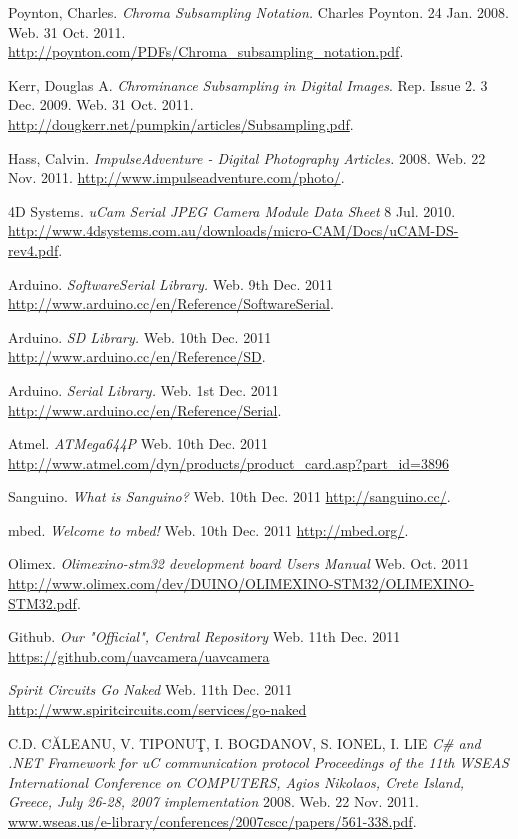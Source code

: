 \begin{thebibliography}{9}
	 Poynton, Charles. \emph{Chroma Subsampling Notation.} Charles Poynton. 24 Jan. 2008. Web. 31 Oct. 2011. \url{http://poynton.com/PDFs/Chroma_subsampling_notation.pdf}.
	
	 Kerr, Douglas A. \emph{Chrominance Subsampling in Digital Images}. Rep. Issue 2. 3 Dec. 2009. Web. 31 Oct. 2011. \url{http://dougkerr.net/pumpkin/articles/Subsampling.pdf}.
	
	 Hass, Calvin. \emph{ImpulseAdventure - Digital Photography Articles.} 2008. Web. 22 Nov. 2011. \url{http://www.impulseadventure.com/photo/}.
	
	 4D Systems. \emph{uCam Serial JPEG Camera Module Data Sheet} 8 Jul. 2010. \url{http://www.4dsystems.com.au/downloads/micro-CAM/Docs/uCAM-DS-rev4.pdf}.

	 Arduino. \emph{SoftwareSerial Library.} Web. 9th Dec. 2011 \url{http://www.arduino.cc/en/Reference/SoftwareSerial}.

	 Arduino. \emph{SD Library.} Web. 10th Dec. 2011 \url{http://www.arduino.cc/en/Reference/SD}.
	
	 Arduino. \emph{Serial Library.} Web. 1st Dec. 2011 \url{http://www.arduino.cc/en/Reference/Serial}.

	 Atmel. \emph{ATMega644P} Web. 10th Dec. 2011 \url{http://www.atmel.com/dyn/products/product_card.asp?part_id=3896}

	 Sanguino. \emph{What is Sanguino?} Web. 10th Dec. 2011 \url{http://sanguino.cc/}.

	 mbed. \emph{Welcome to mbed!} Web. 10th Dec. 2011 \url{http://mbed.org/}.

	 Olimex. \emph{Olimexino-stm32 development board Users Manual} Web. Oct. 2011 \url{http://www.olimex.com/dev/DUINO/OLIMEXINO-STM32/OLIMEXINO-STM32.pdf}.

	 Github. \emph{Our "Official", Central Repository} Web. 11th Dec. 2011 \url{https://github.com/uavcamera/uavcamera}

	 \emph{Spirit Circuits Go Naked} Web. 11th Dec. 2011 \url{http://www.spiritcircuits.com/services/go-naked}
	
	 C.D. CĂLEANU, V. TIPONUŢ, I. BOGDANOV, S. IONEL, I. LIE \emph{C\# and .NET Framework for uC communication protocol Proceedings of the 11th WSEAS International Conference on COMPUTERS, Agios Nikolaos, Crete Island, Greece, July 26-28, 2007
implementation} 2008. Web. 22 Nov. 2011.
\url{www.wseas.us/e-library/conferences/2007cscc/papers/561-338.pdf}.


\end{thebibliography}
